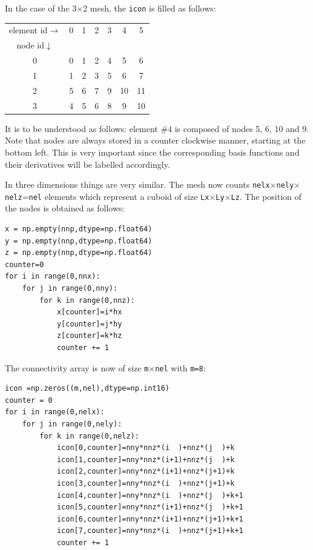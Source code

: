 In the case of the 3$\times$2 mesh, the {\tt icon} is filled as follows:
\begin{center}
\begin{tabular}{ccccccc}
element id$\rightarrow$ &0 &1&2&3&4&5 \\
node id$\downarrow$ \\
0& 0& 1& 2& 4& 5  &6\\
1& 1& 2& 3& 5& 6  &7\\
2& 5& 6& 7& 9& 10 &11\\
3& 4& 5& 6& 8& 9  &10\\
\end{tabular}
\end{center}
It is to be understood as follows: element $\#4$ is composed of nodes 5, 6, 10 and 9.
Note that nodes are always stored in a counter clockwise manner, starting at the bottom left.
This is very important since the corresponding basis functions and their derivatives 
will be labelled accordingly.

In three dimensions things are very similar. The mesh now counts 
{\tt nelx}$\times${\tt nely}$\times${\tt nelz}={\tt nel} elements which represent 
a cuboid of size {\tt Lx}$\times${\tt Ly}$\times${\tt Lz}.
The position of the nodes is obtained as follows:
\begin{lstlisting}
x = np.empty(nnp,dtype=np.float64)
y = np.empty(nnp,dtype=np.float64)
z = np.empty(nnp,dtype=np.float64)
counter=0
for i in range(0,nnx):
    for j in range(0,nny):
        for k in range(0,nnz):
            x[counter]=i*hx
            y[counter]=j*hy
            z[counter]=k*hz
            counter += 1
\end{lstlisting}
The connectivity array is now of size {\tt m}$\times${\tt nel} with {\tt m=8}:
\begin{lstlisting}
icon =np.zeros((m,nel),dtype=np.int16)
counter = 0
for i in range(0,nelx):
    for j in range(0,nely):
        for k in range(0,nelz):
            icon[0,counter]=nny*nnz*(i  )+nnz*(j  )+k
            icon[1,counter]=nny*nnz*(i+1)+nnz*(j  )+k
            icon[2,counter]=nny*nnz*(i+1)+nnz*(j+1)+k
            icon[3,counter]=nny*nnz*(i  )+nnz*(j+1)+k
            icon[4,counter]=nny*nnz*(i  )+nnz*(j  )+k+1
            icon[5,counter]=nny*nnz*(i+1)+nnz*(j  )+k+1
            icon[6,counter]=nny*nnz*(i+1)+nnz*(j+1)+k+1
            icon[7,counter]=nny*nnz*(i  )+nnz*(j+1)+k+1
            counter += 1
\end{lstlisting}



